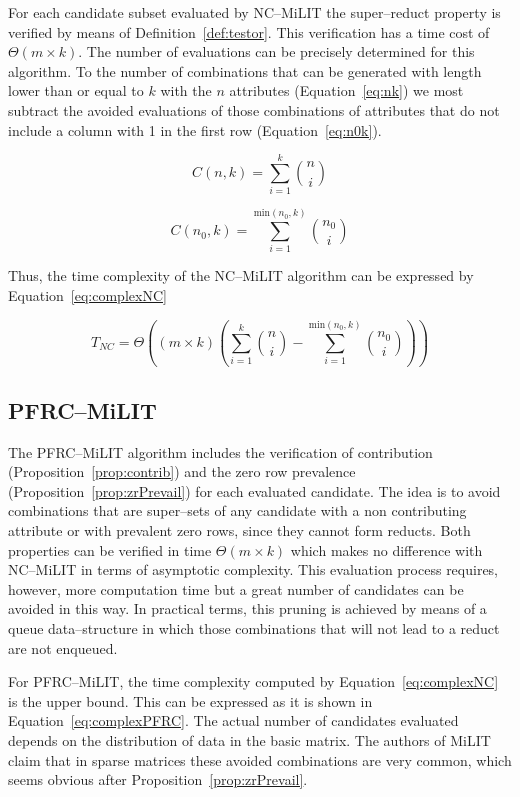 \documentclass[citenumber]{llncs}
\begin{document}
	For each candidate subset evaluated by NC--MiLIT the super--reduct property is verified by means of Definition~\ref{def:testor}. This verification has a time cost of $\Theta(m\times k)$. The number of evaluations can be precisely determined for this algorithm.  To the number of combinations that can be generated with length lower than or equal to $k$ with the $n$ attributes (Equation~\ref{eq:nk}) we most subtract the avoided evaluations of those combinations of attributes that do not include a column with 1 in the first row (Equation~\ref{eq:n0k}).
	
	\begin{equation}
	C(n,k) = \sum_{i=1}^{k} \binom{n}{i}\label{eq:nk}
	\end{equation}
	
	\begin{equation}
	C(n_0,k)= \sum_{i=1}^{\mathrm{min}(n_0,k)} \binom{n_0}{i}\label{eq:n0k}
	\end{equation}
	
	Thus, the time complexity of the NC--MiLIT algorithm can be expressed by Equation~\ref{eq:complexNC}
	
	\begin{equation}
	T_{NC} = \Theta\left((m\times k)\left(\sum_{i=1}^{k} \binom{n}{i} - \sum_{i=1}^{\mathrm{min}(n_0,k)} \binom{n_0}{i}\right)\right)\label{eq:complexNC}
	\end{equation}
%	
\subsection{PFRC--MiLIT}	
%
	The PFRC--MiLIT algorithm includes the verification of contribution (Proposition~\ref{prop:contrib}) and the zero row prevalence (Proposition~\ref{prop:zrPrevail}) for each evaluated candidate. The idea is to avoid combinations that are super--sets of any candidate with a non contributing attribute or with prevalent zero rows, since they cannot form reducts. Both properties can be verified in time $\Theta(m\times k)$ which makes no difference with NC--MiLIT in terms of asymptotic complexity. This evaluation process requires, however, more computation time but a great number of candidates can be avoided in this way. In practical terms, this pruning is achieved by means of a queue data--structure in which those combinations that will not lead to a reduct are not enqueued. 
	
	For PFRC--MiLIT, the time complexity computed by Equation~\ref{eq:complexNC} is the upper bound. This can be expressed as it is shown in Equation~\ref{eq:complexPFRC}. The actual number of candidates evaluated depends on the distribution of data in the basic matrix. The authors of MiLIT claim that in sparse matrices these avoided combinations are very common, which seems obvious after Proposition~\ref{prop:zrPrevail}.
	
\end{document}
